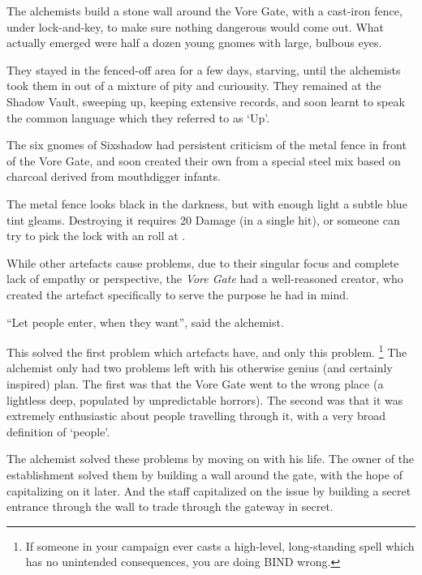 \begin{exampletext}
  The alchemists build a stone wall around the Vore Gate, with a cast-iron fence, under lock-and-key, to make sure nothing dangerous would come out.
  What actually emerged were half a dozen young gnomes with large, bulbous eyes.

  They stayed in the fenced-off area for a few days, starving, until the alchemists took them in out of a mixture of pity and curiousity.
  They remained at the Shadow Vault, sweeping up, keeping extensive records, and soon learnt to speak the common language which they referred to as `Up'.

  The six gnomes of Sixshadow had persistent criticism of the metal fence in front of the Vore Gate, and soon created their own from a special steel mix based on charcoal derived from mouthdigger infants.
\end{exampletext}

The metal fence looks black in the darkness, but with enough light a subtle blue tint gleams.
Destroying it requires 20 Damage (in a single hit), or someone can try to pick the lock with an  roll at \tn[16].

\shadowVaultMap



\begin{exampletext}
  While other \glspl{artefact} cause problems, due to their singular focus and complete lack of empathy or perspective, the \textit{Vore Gate} had a well-reasoned creator, who created the \gls{artefact} specifically to serve the purpose he had in mind.

  ``Let people enter, when they want'', said the alchemist.

  This solved the first problem which \glspl{artefact} have, and only this problem.%
  \footnote{If someone in your campaign ever casts a high-level, long-standing spell which has no unintended consequences, you are doing BIND wrong.}
  The alchemist only had two problems left with his otherwise genius (and certainly inspired) plan.
  The first was that the Vore Gate went to the wrong place (a lightless \gls{deep}, populated by unpredictable horrors).
  The second was that it was extremely enthusiastic about people travelling through it, with a very broad definition of `people'.

  The alchemist solved these problems by moving on with his life.
  The owner of the establishment solved them by building a wall around the gate, with the hope of capitalizing on it later.
  And the staff capitalized on the issue by building a secret entrance through the wall to trade through the gateway in secret.
\end{exampletext}

